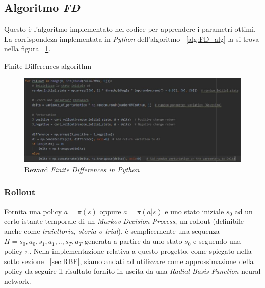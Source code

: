 \subsection{Algoritmo \textit{FD}}
Questo è l'algoritmo implementato nel codice per apprendere i parametri ottimi. 
La corrispondeza implementata in \textit{Python} dell'algoritmo ~\ref{alg:FD_alg} la si trova nella figura ~\ref{fig:FD_py_alg}.

\begin{algorithm} [h!]
	\SetAlgoLined
	\caption{Finite Differences algorithm}
	\label{alg:FD_alg}
\end{algorithm}

\begin{figure}[!h]
	\centering
	\includegraphics[width=\textwidth]{Immagini/FD_alg_python.JPG}
	\caption{Reward \textit{Finite Differences in Python}}
	\label{fig:FD_py_alg}
\end{figure}

\subsubsection{Rollout}
\label{sec:rollout}
Fornita una policy $a = \pi(s)$ oppure $a = \pi(a|s)$ e uno stato iniziale $s_0$ ad un certo istante temporale di un \textit{Markov Decision Process}, un rollout (definibile anche come \textit{traiettoria, storia o trial}), è semplicemente una sequenza \textbf{$H = s_0, a_0, s_1, a_1, .. , s_T, a_T$} generata a partire da uno stato $s_0$ e seguendo una policy $\pi$.
Nella implementazione relativa a questo progetto, come spiegato nella sotto sezione ~\ref{sec:RBF}, siamo andati ad utilizzare come approssimazione della policy da seguire il risultato fornito in uscita da una \textit{Radial Basis Function} neural network. 


